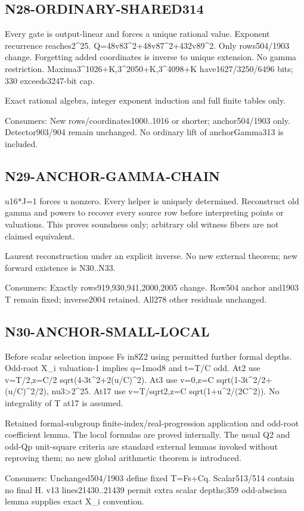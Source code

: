 \documentclass{article}
\begin{document}
\subsection{N28-ORDINARY-SHARED314}
\label{outline:r4-n28-ordinary-shared314}
Every gate is output-linear and forces a unique rational value. Exponent recurrence reaches2\textasciicircum{}25. Q=48v83\textasciicircum{}2+48v87\textasciicircum{}2+432v89\textasciicircum{}2. Only rows504/1903 change. Forgetting added coordinates is inverse to unique extension. No gamma restriction. Maxima3\textasciicircum{}1026+K,3\textasciicircum{}2050+K,3\textasciicircum{}4098+K have1627/3250/6496 bits; 330 exceeds3247-bit cap.
\par Exact rational algebra, integer exponent induction and full finite tables only.
\par Consumers: New rows/coordinates1000..1016 or shorter; anchor504/1903 only. Detector903/904 remain unchanged. No ordinary lift of anchorGamma313 is included.
\subsection{N29-ANCHOR-GAMMA-CHAIN}
\label{outline:r4-n29-anchor-gamma-chain}
u16*J=1 forces u nonzero. Every helper is uniquely determined. Reconstruct old gamma and powers to recover every source row before interpreting points or valuations. This proves soundness only; arbitrary old witness fibers are not claimed equivalent.
\par Laurent reconstruction under an explicit inverse. No new external theorem; new forward existence is N30..N33.
\par Consumers: Exactly rows919,930,941,2000,2005 change. Row504 anchor and1903 T remain fixed; inverse2004 retained. All278 other residuals unchanged.
\subsection{N30-ANCHOR-SMALL-LOCAL}
\label{outline:r4-n30-anchor-small-local}
Before scalar selection impose Fs in8Z2 using permitted further formal depths. Odd-root X\_i valuation-1 implies q=1mod8 and t=T/C odd. At2 use v=T/2,z=C/2 sqrt(4-3t\textasciicircum{}2+2(u/C)\textasciicircum{}2). At3 use v=0,z=C sqrt(1-3t\textasciicircum{}2/2+(u/C)\textasciicircum{}2/2), nu3>2\textasciicircum{}25. At17 use v=T/sqrt2,z=C sqrt(1+u\textasciicircum{}2/(2C\textasciicircum{}2)). No integrality of T at17 is assumed.
\par Retained formal-subgroup finite-index/real-progression application and odd-root coefficient lemma. The local formulas are proved internally. The usual Q2 and odd-Qp unit-square criteria are standard external lemmas invoked without reproving them; no new global arithmetic theorem is introduced.
\par Consumers: Unchanged504/1903 define fixed T=Fs+Cq. Scalar513/514 contain no final H. v13 lines21430..21439 permit extra scalar depths;359 odd-abscissa lemma supplies exact X\_i convention.
\end{document}
